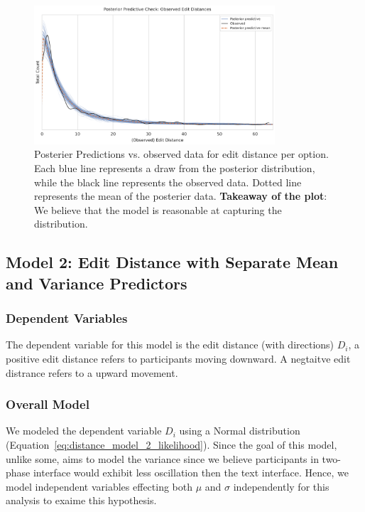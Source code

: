 \begin{figure}[h!]
    \centering
    \includegraphics[width=0.8\textwidth]{content/image/distance/ppc_distance_m1.pdf}
    \caption{Posterier Predictions vs. observed data for edit distance per option. Each blue line represents a draw from the posterior distribution, while the black line represents the observed data. Dotted line represents the mean of the posterier data. \textbf{Takeaway of the plot}: We believe that the model is reasonable at capturing the distribution.}
    \label{fig:ppc_distance_m1}
\end{figure}


\subsection{Model 2: Edit Distance with Separate Mean and Variance Predictors} \label{sec:apdx:model_distance_variance}

\subsubsection{Dependent Variables}
The dependent variable for this model is the edit distance (with directions) $D_i$, a positive edit distance refers to participants moving downward. A negtaitve edit distrance refers to a upward movement.

\subsubsection{Overall Model}
We modeled the dependent variable $D_i$ using a Normal distribution (Equation~\ref{eq:distance_model_2_likelihood}). Since the goal of this model, unlike some, aims to model the variance since we believe participants in two-phase interface would exhibit less oscillation then the text interface. Hence, we model independent variables effecting both $\mu$ and $\sigma$ independently for this analysis to exaime this hypothesis.

